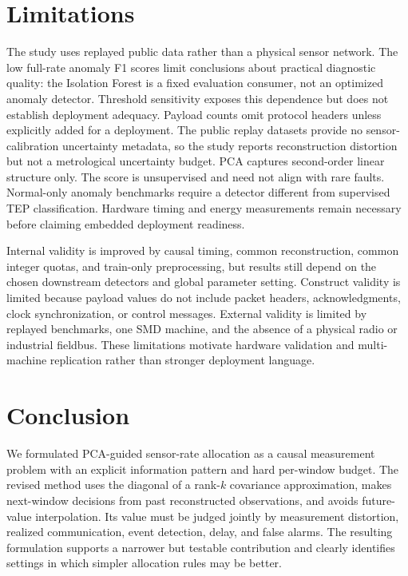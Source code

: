 \documentclass[12pt]{article}
\begin{document}
\section{Limitations}

The study uses replayed public data rather than a physical sensor network.
The low full-rate anomaly F1 scores limit conclusions about practical diagnostic
quality: the Isolation Forest is a fixed evaluation consumer, not an optimized
anomaly detector. Threshold sensitivity exposes this dependence but does not
establish deployment adequacy.
Payload counts omit protocol headers unless explicitly added for a deployment.
The public replay datasets provide no sensor-calibration uncertainty metadata,
so the study reports reconstruction distortion but not a metrological
uncertainty budget.
PCA captures second-order linear structure only. The score is unsupervised and
need not align with rare faults. Normal-only anomaly benchmarks require a
detector different from supervised TEP classification. Hardware timing and
energy measurements remain necessary before claiming embedded deployment
readiness.

Internal validity is improved by causal timing, common reconstruction, common
integer quotas, and train-only preprocessing, but results still depend on the
chosen downstream detectors and global parameter setting. Construct validity
is limited because payload values do not include packet headers, acknowledgments,
clock synchronization, or control messages. External validity is limited by
replayed benchmarks, one SMD machine, and the absence of a physical radio or
industrial fieldbus. These limitations motivate hardware validation and
multi-machine replication rather than stronger deployment language.

\section{Conclusion}

We formulated PCA-guided sensor-rate allocation as a causal measurement
problem with an explicit information pattern and hard per-window budget. The
revised method uses the diagonal of a rank-$k$ covariance approximation, makes
next-window decisions from past reconstructed observations, and avoids future-
value interpolation. Its value must be judged jointly by measurement
distortion, realized communication, event detection, delay, and false alarms.
The resulting formulation supports a narrower but testable contribution and
clearly identifies settings in which simpler allocation rules may be better.
\end{document}

